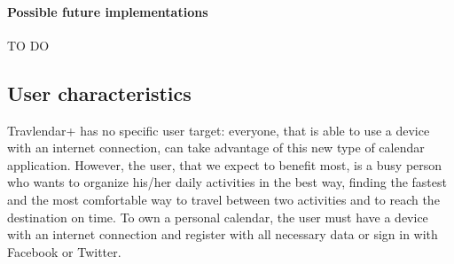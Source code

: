 \documentclass[12pt,titlepage]{article}
\begin{document}
\paragraph{Possible future implementations} 
TO DO

\subsection{User characteristics}\label{sec:mod1}
Travlendar+ has no specific user target: everyone, that is able to use a device with an internet connection, can take advantage of this new type of calendar application.
However, the user, that we expect to benefit most, is a busy person who wants to organize his/her daily activities in the best way, finding the fastest and the most comfortable way to travel between two activities and to reach the destination on time.
To own a personal calendar, the user must have a device with an internet connection and register with all necessary data or sign in with Facebook or Twitter.
\end{document}
